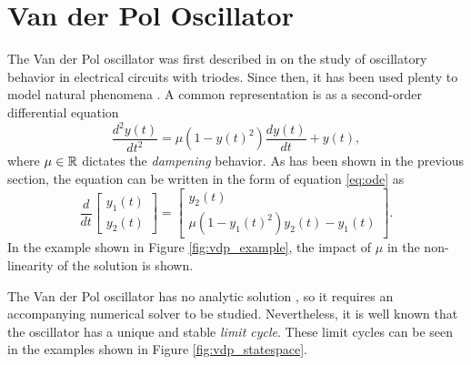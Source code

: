 \section{Van der Pol Oscillator}

The Van der Pol oscillator was first described in \textcite{van_der_pol_theory_1920} on the study of oscillatory behavior in electrical circuits with triodes.
Since then, it has been used plenty to model natural phenomena \cite{lucero_modeling_2013,fitzhugh_impulses_1961,nagumo_active_1962,cartwright_dynamics_1999}.
A common representation is as a second-order differential equation \[
    \frac{d^2 y(t)}{dt^2} = \mu\left( 1-y(t)^2 \right) \frac{d y(t)}{dt} + y(t)
,\] 
where $\mu\in \mathbb{R}$ dictates the \emph{dampening} behavior. 
As has been shown in the previous section, the equation can be written in the form of equation \eqref{eq:ode} as
\begin{equation}\label{eq:vdp}
    \frac{d}{dt}\begin{bmatrix} y_1\left( t \right) \\ y_2\left( t \right)  \end{bmatrix} = \begin{bmatrix} 
y_2\left( t \right) \\
\mu\left( 1-y_1\left( t \right) ^2 \right) y_2\left( t \right) - y_1(t)
\end{bmatrix} 
.\end{equation}
In the example shown in Figure \ref{fig:vdp_example}, the impact of $\mu$ in the non-linearity of the solution is shown.

The Van der Pol oscillator has no analytic solution \cite{panayotounakos_lack_2003}, so it requires an accompanying numerical solver to be studied.
Nevertheless, it is well known that the oscillator has a unique and stable \emph{limit cycle}\footnotemark \cite{grimshaw_nonlinear_1993}. 
These limit cycles can be seen in the examples shown in Figure \ref{fig:vdp_statespace}.

